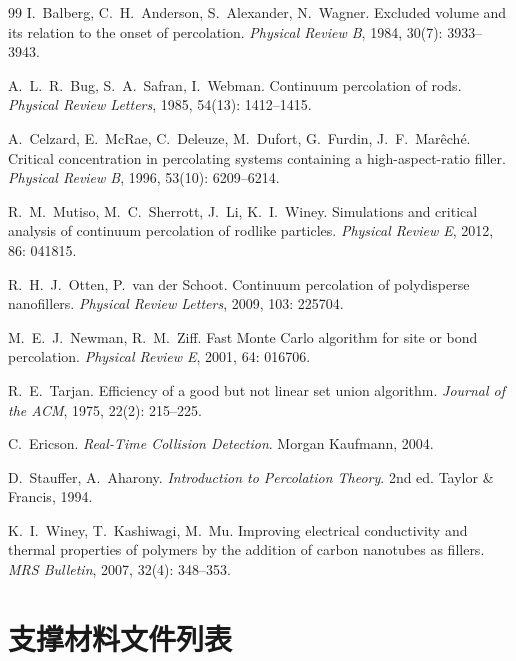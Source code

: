 \documentclass[UTF8,a4paper,zihao=-4,fontset=none]{ctexart}
\begin{document}
\begin{thebibliography}{99}
I.~Balberg, C.~H.~Anderson, S.~Alexander, N.~Wagner.
Excluded volume and its relation to the onset of percolation.
\textit{Physical Review B}, 1984, 30(7): 3933--3943.

A.~L.~R.~Bug, S.~A.~Safran, I.~Webman.
Continuum percolation of rods.
\textit{Physical Review Letters}, 1985, 54(13): 1412--1415.

A.~Celzard, E.~McRae, C.~Deleuze, M.~Dufort, G.~Furdin, J.~F.~Mar\^{e}ch\'{e}.
Critical concentration in percolating systems containing a high-aspect-ratio filler.
\textit{Physical Review B}, 1996, 53(10): 6209--6214.

R.~M.~Mutiso, M.~C.~Sherrott, J.~Li, K.~I.~Winey.
Simulations and critical analysis of continuum percolation of rodlike particles.
\textit{Physical Review E}, 2012, 86: 041815.

R.~H.~J.~Otten, P.~van der Schoot.
Continuum percolation of polydisperse nanofillers.
\textit{Physical Review Letters}, 2009, 103: 225704.

M.~E.~J.~Newman, R.~M.~Ziff.
Fast Monte Carlo algorithm for site or bond percolation.
\textit{Physical Review E}, 2001, 64: 016706.

R.~E.~Tarjan.
Efficiency of a good but not linear set union algorithm.
\textit{Journal of the ACM}, 1975, 22(2): 215--225.

C.~Ericson.
\textit{Real-Time Collision Detection}.
Morgan Kaufmann, 2004.

D.~Stauffer, A.~Aharony.
\textit{Introduction to Percolation Theory}.
2nd ed. Taylor \& Francis, 1994.

K.~I.~Winey, T.~Kashiwagi, M.~Mu.
Improving electrical conductivity and thermal properties of polymers by the addition of carbon nanotubes as fillers.
\textit{MRS Bulletin}, 2007, 32(4): 348--353.
\end{thebibliography}

\appendix
\section{支撑材料文件列表}
\end{document}
